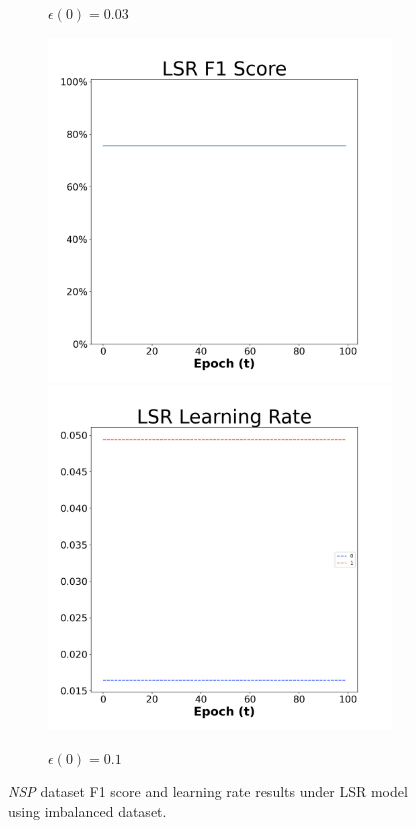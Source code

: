 \begin{figure}[H]
\begin{subfigure}{0.3\textwidth}
  \caption{$\epsilon(0)=0.03$}
\end{subfigure}\hfil %
\begin{subfigure}{0.3\textwidth}
  \includegraphics[width=\linewidth]{images/exper2/NSP/LSR_0.1_f1.png}
  \includegraphics[width=\linewidth]{images/exper2/NSP/LSR_0.1_lr.png}
  \caption{$\epsilon(0)=0.1$}
\end{subfigure}

\caption{\textit{NSP} dataset F1 score and learning rate results under LSR model using imbalanced dataset.}
\end{figure}


